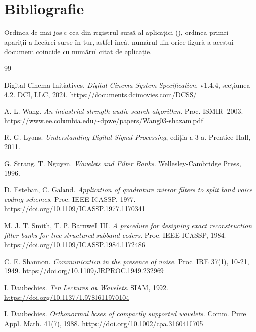 \chapter*{Bibliografie}

Ordinea de mai jos e cea din registrul sursă al aplicației
(), ordinea primei apariții a
fiecărei surse în tur, astfel încât numărul \txt{[n]} din orice figură a
acestui document coincide cu numărul citat de aplicație.

\begin{thebibliography}{99}

 Digital Cinema Initiatives. \emph{Digital Cinema System
  Specification}, v1.4.4, secțiunea 4.2. DCI, LLC, 2024.
  \url{https://documents.dcimovies.com/DCSS/}

 A. L. Wang. \emph{An industrial-strength audio search
  algorithm}. Proc. ISMIR, 2003.
  \url{https://www.ee.columbia.edu/~dpwe/papers/Wang03-shazam.pdf}

 R. G. Lyons. \emph{Understanding Digital Signal
  Processing}, ediția a 3-a. Prentice Hall, 2011.

 G. Strang, T. Nguyen. \emph{Wavelets and Filter
  Banks}. Wellesley-Cambridge Press, 1996.

 D. Esteban, C. Galand. \emph{Application of
  quadrature mirror filters to split band voice coding schemes}. Proc. IEEE
  ICASSP, 1977. \url{https://doi.org/10.1109/ICASSP.1977.1170341}

 M. J. T. Smith, T. P. Barnwell III. \emph{A
  procedure for designing exact reconstruction filter banks for
  tree-structured subband coders}. Proc. IEEE ICASSP, 1984.
  \url{https://doi.org/10.1109/ICASSP.1984.1172486}

 C. E. Shannon. \emph{Communication in the presence of
  noise}. Proc. IRE 37(1), 10-21, 1949.
  \url{https://doi.org/10.1109/JRPROC.1949.232969}

 I. Daubechies. \emph{Ten Lectures on Wavelets}.
  SIAM, 1992. \url{https://doi.org/10.1137/1.9781611970104}

 I. Daubechies. \emph{Orthonormal bases of compactly
  supported wavelets}. Comm. Pure Appl. Math. 41(7), 1988.
  \url{https://doi.org/10.1002/cpa.3160410705}


\end{thebibliography}

